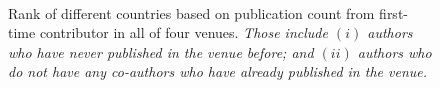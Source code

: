 \begin{figure}[!htbp]
	\centering
	\\
	\caption{Rank of different countries based on publication count from first-time contributor in all of four venues. \textit{ Those include $(i)$ authors who have never published in the venue before; and $(ii)$ authors who do not have any co-authors who have already published in the venue.}}
	\label{fig:country_emer}
\end{figure}

